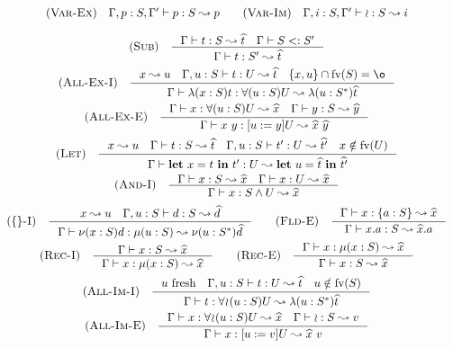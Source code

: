 \[\begin{array}{c}
    \RULE{Var-Ex} \quad \TJ{\Gamma, p: S, \Gamma'}{p}{S}{p} \qquad

    \RULE{Var-Im} \quad \TJ{\Gamma, i: S, \Gamma'}{\IMP}{S}{i} \\[4mm]

    \RULE{Sub} \quad \inference{
        \TJ{\Gamma}{t}{S}{\HAT{t}} \quad
        \SJ{\Gamma}{S}{S'}
    }{
        \TJ{\Gamma}{t}{S'}{\HAT{t}}
    } \\[4mm]

    \RULE{All-Ex-I} \quad \inference{
        x \leadsto u \quad
        \TJ{\Gamma, u: S}{t}{U}{\HAT{t}} \quad
        \{x, u\} \cap \FV{S} = \o
    }{
        \TJ{\Gamma}{\ABS{x}{S}{t}}{\DFUN{u}{S}{U}}{\ABS{u}{\TRANS{S}}{\HAT{t}}}
    } \\[4mm]

    \RULE{All-Ex-E} \quad \inference{
        \TJ{\Gamma}{x}{\DFUN{u}{S}{U}}{\HAT{x}} \quad
        \TJ{\Gamma}{y}{S}{\HAT{y}}
    }{
        \TJ{\Gamma}{x\ y}{\SUB{u}{y}U}{\HAT{x}\ \HAT{y}}
    } \\[4mm]

    \RULE{Let} \quad \inference{
        x \leadsto u \quad
        \TJ{\Gamma}{t}{S}{\HAT{t}} \quad
        \TJ{\Gamma, u: S}{t'}{U}{\HAT{t'}} \quad
        x \notin \FV{U}
    }{
        \TJ{\Gamma}{\LET{x}{t}{t'}}{U}{\LET{u}{\HAT{t}}{\HAT{t'}}}
    } \\[4mm]

    \RULE{And-I} \quad \inference{
        \TJ{\Gamma}{x}{S}{\HAT{x}} \quad
        \TJ{\Gamma}{x}{U}{\HAT{x}}
    }{
        \TJ{\Gamma}{x}{\AGG{S}{U}}{\HAT{x}}
    } \\[4mm]

    \RULE{\{\}-I} \quad \inference{
        x \leadsto u \quad
        \TJ{\Gamma, u: S}{d}{S}{\HAT{d}}
    }{
        \TJ{\Gamma}{\OBJ{x}{S}{d}}{\REC{u}{S}}{\OBJ{u}{\TRANS{S}}{\HAT{d}}}
    } \qquad

    \RULE{Fld-E} \quad \inference{
        \TJ{\Gamma}{x}{\FDEC{a}{S}}{\HAT{x}}
    }{
        \TJ{\Gamma}{x.a}{S}{\HAT{x}.a}
    } \\[4mm]

    \RULE{Rec-I} \quad \inference{
        \TJ{\Gamma}{x}{S}{\HAT{x}}
    }{
        \TJ{\Gamma}{x}{\REC{x}{S}}{\HAT{x}}
    } \qquad

    \RULE{Rec-E} \quad \inference{
        \TJ{\Gamma}{x}{\REC{x}{S}}{\HAT{x}}
    }{
        \TJ{\Gamma}{x}{S}{\HAT{x}}
    } \\[4mm]

    \RULE{All-Im-I} \quad \inference{
        u\ \text{fresh} \quad
        \TJ{\Gamma, u: S}{t}{U}{\HAT{t}} \quad
        u \notin \FV{S}
    }{
        \TJ{\Gamma}{t}{\IFUN{u}{S}{U}}{\ABS{u}{\TRANS{S}}{\HAT{t}}}
    } \\[4mm]

    \RULE{All-Im-E} \quad \inference{
        \TJ{\Gamma}{x}{\IFUN{u}{S}{U}}{\HAT{x}} \quad
        \TJ{\Gamma}{\IMP}{S}{v}
    }{
        \TJ{\Gamma}{x}{\SUB{u}{v}U}{\HAT{x}\ v}
    }
\end{array}\]
